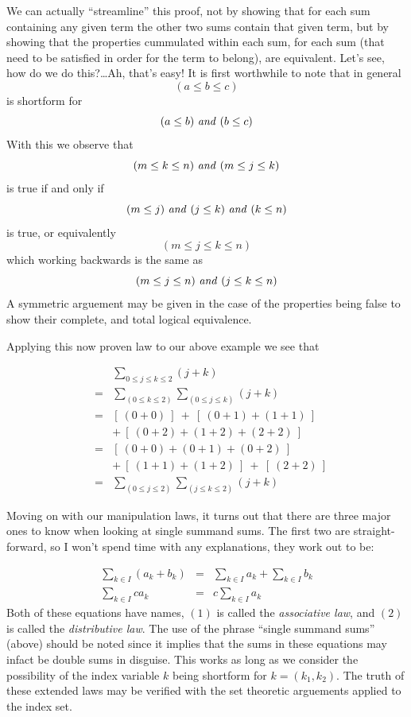 \documentclass[twoside]{article}
\begin{document}
We can actually ``streamline'' this proof, not by showing that 
for each sum containing any given term the other two sums 
contain that given term, but by showing that the properties 
cummulated within each sum, for each sum (that need to be 
satisfied in order for the term to belong), are equivalent.  
Let's see, how do we do this?\ldots Ah, that's easy!
It is first worthwhile to note that in general 
$$  (a\le b\le c)  $$ is shortform for
$$  (a\le b)\mbox{ \emph{and} } (b\le c)  $$
With this we observe that
$$  (m\le k\le n)\mbox{ \emph{and} } (m\le j\le k)  $$ 
is true if and only if
$$  (m\le j)\mbox{ \emph{and} } (j\le k)\mbox{ \emph{and} } (k\le n)  $$ 
is true, or equivalently 
$$  (m\le j\le k\le n)  $$ which working backwards is the same as
$$  (m\le j\le n)\mbox{ \emph{and} } (j\le k\le n)  $$
A symmetric arguement may be given in the case of the properties
being false to show their complete, and total logical equivalence.  

Applying this now proven law to our above example we see that

\begin{eqnarray*}
 &   & \sum_{0\le j\le k\le 2}\!\!\!\!\! (j+k)                  \\
 & = & \sum_{(0\le k\le 2)}\sum_{(0\le j\le k)}\!\!\!\! (j+k)   \\ 
 & = & [\ (0+0)\ ]\ +\ [\ (0+1)+(1+1)\ ]                        \\
 &   & +\ [\ (0+2)+(1+2)+(2+2)\ ]                               \\
 & = & [\ (0+0)+(0+1)+(0+2)\ ]                                  \\
 &   & +\ [\ (1+1)+(1+2)\ ]\ +\ [\ (2+2)\ ]                     \\ 
 & = & \sum_{(0\le j\le 2)}\sum_{(j\le k\le 2)}\!\!\!\! (j+k)             
\end{eqnarray*} 

Moving on with our manipulation laws, it turns out that there are 
three major ones to know when looking at single summand sums.  
The first two are straight-forward, so I won't spend time with any 
explanations, they work out to be:

\begin{eqnarray}
\sum_{k\in I}(a_k+b_k) & = & \sum_{k\in I}a_k+\sum_{k\in I}b_k \\
\sum_{k\in I}ca_k & = & c\sum_{k\in I}a_k 
\end{eqnarray} Both of these equations have names, $  (1)  $ is 
called the \emph{associative law}, and $  (2)  $ is called the 
\emph{distributive law}.  The use of the phrase ``single summand 
sums'' (above) should be noted since it implies that the sums in 
these equations may infact be double sums in disguise.  This works 
as long as we consider the possibility of the index variable 
$  k  $ being shortform for $  k=(k_1,k_2)  $.  The truth of these 
extended laws may be verified with the set theoretic arguements 
applied to the index set.
\end{document}
